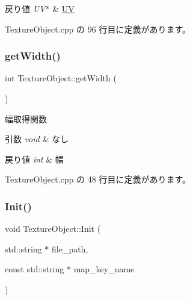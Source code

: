 \begin{DoxyRetVals}{戻り値}
{\em U\+V$\ast$} & \mbox{\hyperlink{class_texture_object_1_1_u_v}{UV}} \\
\hline
\end{DoxyRetVals}


 Texture\+Object.\+cpp の 96 行目に定義があります。

\mbox{\label{class_texture_object_a578484836fe30262396a8245d89adaad}} 
\subsubsection{\texorpdfstring{get\+Width()}{getWidth()}}
{\footnotesize\ttfamily int Texture\+Object\+::get\+Width (\begin{DoxyParamCaption}{ }\end{DoxyParamCaption})}



幅取得関数 


\begin{DoxyParams}{引数}
{\em void} & なし \\
\hline
\end{DoxyParams}

\begin{DoxyRetVals}{戻り値}
{\em int} & 幅 \\
\hline
\end{DoxyRetVals}


 Texture\+Object.\+cpp の 48 行目に定義があります。

\mbox{\label{class_texture_object_a53336f35e430798b4a129ce41b4471d1}} 
\subsubsection{\texorpdfstring{Init()}{Init()}}
{\footnotesize\ttfamily void Texture\+Object\+::\+Init (\begin{DoxyParamCaption}\item[{std\+::string $\ast$}]{file\+\_\+path,  }\item[{const std\+::string $\ast$}]{map\+\_\+key\+\_\+name }\end{DoxyParamCaption})}




